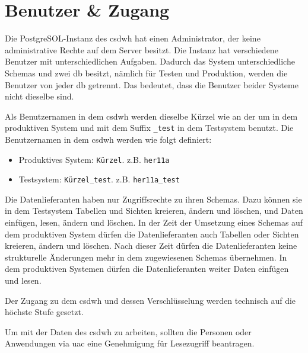 \chapter{Benutzer \& Zugang} \label{ch:usr}

Die PostgreSOL-Instanz des \ac{csdwh} hat einen Administrator, der keine administrative Rechte auf dem Server besitzt. Die Instanz hat verschiedene Benutzer mit unterschiedlichen Aufgaben. Dadurch das System unterschiedliche Schemas und zwei \ac{db} besitzt, nämlich für Testen und Produktion, werden die Benutzer von jeder \ac{db} getrennt. Das bedeutet, dass die Benutzer beider Systeme nicht dieselbe sind. 

Als Benutzernamen in dem \ac{csdwh} werden dieselbe Kürzel wie an der \ac{um} in dem produktiven System und mit dem Suffix \texttt{\_test} in dem Testsystem benutzt. Die Benutzernamen in dem \ac{csdwh} werden wie folgt definiert:
\begin{itemize}
	\item Produktives System: \texttt{Kürzel}. z.B. \texttt{her11a}
	\item Testsystem: \texttt{Kürzel\_test}. z.B. \texttt{her11a\_test}
\end{itemize}

Die Datenlieferanten haben nur Zugriffsrechte zu ihren Schemas. Dazu können sie in dem Testsystem Tabellen und Sichten kreieren, ändern und löschen, und Daten einfügen, lesen, ändern und löschen. In der Zeit der Umsetzung eines Schemas auf dem produktiven System dürfen die Datenlieferanten auch Tabellen oder Sichten kreieren, ändern und löschen. Nach dieser Zeit dürfen die Datenlieferanten keine strukturelle Änderungen mehr in dem zugewiesenen Schemas übernehmen. In dem produktiven Systemen dürfen die Datenlieferanten weiter Daten einfügen und lesen.

Der Zugang zu dem \ac{csdwh} und dessen Verschlüsselung werden technisch auf die höchste Stufe gesetzt.

Um mit der Daten des \ac{csdwh} zu arbeiten, sollten die Personen oder Anwendungen via \ac{uac} eine Genehmigung für Lesezugriff beantragen.